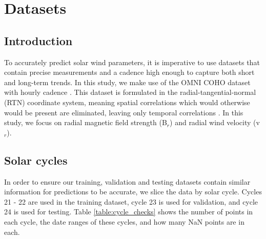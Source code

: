 \section{Datasets}
\label{sec:datasets}
\subsection{Introduction}
\label{subsec:datasets_intro}

To accurately predict solar wind parameters, it is imperative to use
datasets that contain precise measurements and a cadence high enough to
capture both short and long-term trends. In this study, we make use of
the OMNI COHO dataset with hourly cadence \citep{cdaweb_omnicoho1hr}.
This dataset is formulated in the radial-tangential-normal (RTN)
coordinate system, meaning spatial correlations which would otherwise
would be present are eliminated, leaving only temporal correlations
\citep{owens_riley_2017}. In this study, we focus on radial magnetic field
strength (B$_r$) and radial wind velocity (v$_r$).

\subsection{Solar cycles}
\label{subsec:solar_cycles}

In order to ensure our training, validation and testing datasets contain
similar information for predictions to be accurate, we slice the data by
solar cycle. Cycles 21 - 22 are used in the training dataset, cycle 23 is
used for validation, and cycle 24 is used for testing. Table
\ref{table:cycle_checks} shows the number of points in each cycle, the
date ranges of these cycles, and how many NaN points are in each.




